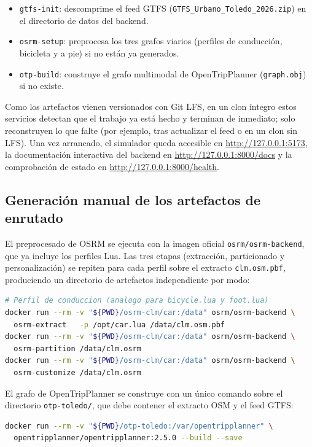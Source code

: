 \begin{itemize}
  \item \texttt{gtfs-init}: descomprime el feed GTFS (\texttt{GTFS\_Urbano\_Toledo\_2026.zip}) en el directorio de datos del backend.
  \item \texttt{osrm-setup}: preprocesa los tres grafos viarios (perfiles de conducción, bicicleta y a pie) si no están ya generados.
  \item \texttt{otp-build}: construye el grafo multimodal de OpenTripPlanner (\texttt{graph.obj}) si no existe.
\end{itemize}

Como los artefactos vienen versionados con Git LFS, en un clon íntegro estos servicios detectan que el trabajo ya está hecho y terminan de inmediato; solo reconstruyen lo que falte (por ejemplo, tras actualizar el feed o en un clon sin LFS). Una vez arrancado, el simulador queda accesible en \url{http://127.0.0.1:5173}, la documentación interactiva del backend en \url{http://127.0.0.1:8000/docs} y la comprobación de estado en \url{http://127.0.0.1:8000/health}.

\subsection{Generación manual de los artefactos de enrutado}

El preprocesado de OSRM se ejecuta con la imagen oficial \texttt{osrm/osrm-backend}, que ya incluye los perfiles Lua. Las tres etapas (extracción, particionado y personalización) se repiten para cada perfil sobre el extracto \texttt{clm.osm.pbf}, produciendo un directorio de artefactos independiente por modo:

\begin{lstlisting}[language=bash]
# Perfil de conduccion (analogo para bicycle.lua y foot.lua)
docker run --rm -v "${PWD}/osrm-clm/car:/data" osrm/osrm-backend \
  osrm-extract   -p /opt/car.lua /data/clm.osm.pbf
docker run --rm -v "${PWD}/osrm-clm/car:/data" osrm/osrm-backend \
  osrm-partition /data/clm.osrm
docker run --rm -v "${PWD}/osrm-clm/car:/data" osrm/osrm-backend \
  osrm-customize /data/clm.osrm
\end{lstlisting}

El grafo de OpenTripPlanner se construye con un único comando sobre el directorio \texttt{otp-toledo/}, que debe contener el extracto OSM y el feed GTFS:

\begin{lstlisting}[language=bash]
docker run --rm -v "${PWD}/otp-toledo:/var/opentripplanner" \
  opentripplanner/opentripplanner:2.5.0 --build --save
\end{lstlisting}

